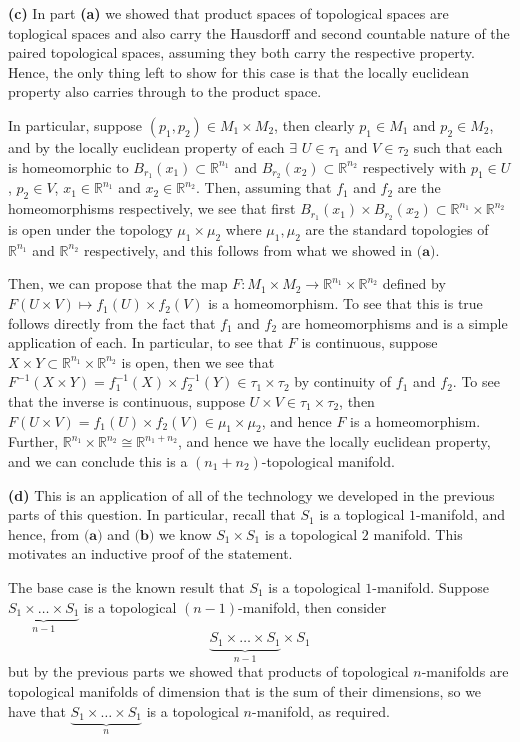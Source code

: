 \documentclass[10pt]{article}
\newcommand{\R}{\mathbb{R}}
\begin{document}
\textbf{(c)} In part \textbf{(a)} we showed that product spaces of topological spaces are toplogical spaces and also carry the Hausdorff and second countable nature of the paired topological spaces, assuming they both carry the respective property. Hence, the only thing left to show for this case is that the locally euclidean property also carries through to the product space.

In particular, suppose $(p_{1},p_{2})\in M_{1}\times M_{2}$, then clearly $p_{1}\in M_{1}$ and $p_{2}\in M_{2}$, and by the locally euclidean property of each $\exists$ $U\in \tau_{1}$ and $V\in \tau_{2}$ such that each is homeomorphic to $B_{r_{1}}(x_{1}) \subset \R^{n_{1}}$ and $B_{r_{2}}(x_{2}) \subset \R^{n_{2}}$ respectively with $p_{1}\in U$, $p_{2} \in V$, $x_{1} \in \R^{n_{1}}$ and $x_{2}\in \R^{n_{2}}$. Then, assuming that $f_{1}$ and $f_{2}$ are the homeomorphisms respectively, we see that first $B_{r_{1}}(x_{1})\times B_{r_{2}}(x_{2})\subset \R^{n_{1}}\times \R^{n_{2}}$ is open under the topology $\mu_{1}\times\mu_{2}$ where $\mu_{1},\mu_{2}$ are the standard topologies of $\R^{n_{1}}$ and $\R^{n_{2}}$ respectively, and this follows from what we showed in $\textbf{(a)}$.

Then, we can propose that the map $F: M_{1}\times M_{2} \to \R^{n_{1}}\times \R^{n_{2}}$ defined by $F(U\times V) \mapsto f_{1}(U)\times f_{2}(V)$ is a homeomorphism. To see that this is true follows directly from the fact that $f_{1}$ and $f_{2}$ are homeomorphisms and is a simple application of each. In particular, to see that $F$ is continuous, suppose $X\times Y \subset \R^{n_{1}}\times \R^{n_{2}}$ is open, then we see that $F^{-1}(X\times Y) = f_{1}^{-1}(X) \times f_{2}^{-1}(Y) \in \tau_{1}\times \tau_{2}$ by continuity of $f_{1}$ and $f_{2}$. To see that the inverse is continuous, suppose $U\times V \in \tau_{1}\times \tau_{2}$, then $F(U\times V) = f_{1}(U)\times f_{2}(V) \in \mu_{1}\times \mu_{2}$, and hence $F$ is a homeomorphism. Further, $\R^{n_{1}}\times \R^{n_{2}} \cong \R^{n_{1}+n_{2}}$, and hence we have the locally euclidean property, and we can conclude this is a $(n_{1}+n_{2})$-topological manifold.

\textbf{(d)} This is an application of all of the technology we developed in the previous parts of this question. In particular, recall that $S_{1}$ is a toplogical $1$-manifold, and hence, from $\textbf{(a)}$ and $\textbf{(b)}$ we know $S_{1} \times S_{1}$ is a topological $2$ manifold. This motivates an inductive proof of the statement.

The base case is the known result that $S_{1}$ is a topological $1$-manifold. Suppose $\underbrace{S_{1}\times \dots \times S_{1}}_{n-1}$ is a topological $(n-1)$-manifold, then consider
$$\underbrace{S_{1}\times \dots \times S_{1}}_{n-1}\times S_{1}$$
but by the previous parts we showed that products of topological $n$-manifolds are topological manifolds of dimension that is the sum of their dimensions, so we have that $\underbrace{S_{1}\times \dots \times S_{1}}_{n}$ is a topological $n$-manifold, as required.
\end{document}

